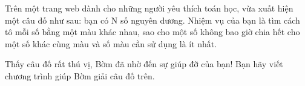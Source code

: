 Trên một trang web dành cho những người yêu thích toán học, vừa xuất hiện một câu đố như sau: bạn có N số nguyên dương. Nhiệm vụ của bạn là tìm cách tô mỗi số bằng một màu khác nhau, sao cho một số không bao giờ chia hết cho một số khác cùng màu và số màu cần sử dụng là ít nhất.  

   Thấy câu đố rất thú vị, Bờm đã nhờ đến sự giúp đỡ của bạn! Bạn hãy viết chương trình giúp Bờm giải câu đố trên.